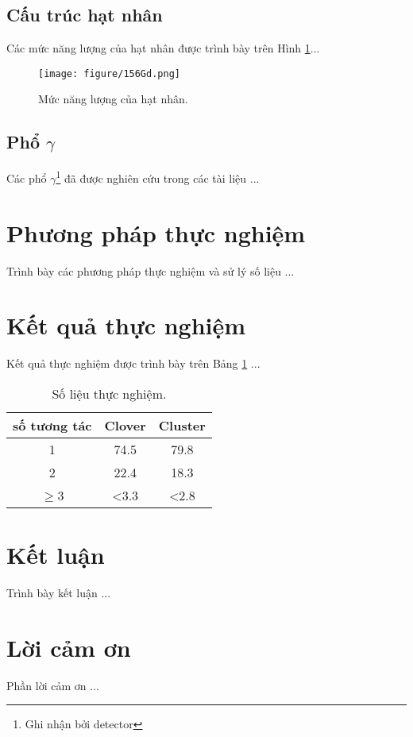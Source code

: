\documentclass[11pt, bold, center]{journal}
\begin{document}





\subsection{Cấu trúc hạt nhân}
Các mức năng lượng của hạt nhân được trình bày trên Hình \ref{fig:nangluong}...




\begin{figure}[!htb]
\centering
\texttt{[image: figure/156Gd.png]}
\caption{Mức năng lượng của hạt nhân.}
\label{fig:nangluong}
\end{figure}



\subsection{Phổ $\gamma$}
Các phổ $\gamma$\footnote{Ghi nhận bởi detector} đã được nghiên cứu trong các tài liệu \cite{bib_Bazzaco, bib_Simpson, bib_ghinhanbucxa} ...



\section{Phương pháp thực nghiệm}
Trình bày các phương pháp thực nghiệm và sử lý số liệu ...



\section{Kết quả thực nghiệm}
Kết quả thực nghiệm được trình bày trên Bảng \ref{tab:solieu} ...
 
\begin{table}[!htb]
\centering
\caption{Số liệu thực nghiệm.}
\label{tab:solieu} 
\begin{tabular}{ccc}
\hline
số tương tác	& Clover 	& Cluster\\
\hline
1	& 74.5 & 79.8\\
2	& 22.4 & 18.3\\
$\ge$3	& <3.3 & <2.8\\
\hline
\end{tabular}
\end{table}

\section{Kết luận}
Trình bày kết luận ...


\section{Lời cảm ơn}
Phần lời cảm ơn ...
 



\end{document}
